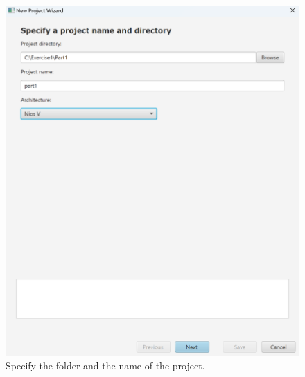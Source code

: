 \documentclass[epsfig,10pt,fullpage]{article}
\begin{document}
\begin{enumerate}
\begin{figure}[H]
	\begin{center}
	\includegraphics[scale=0.33]{figures/Snap2.png}
	\end{center}
	\caption{Specify the folder and the name of the project.}
\label{fig:MP2}
\end{figure}


\end{enumerate}
\end{document}
